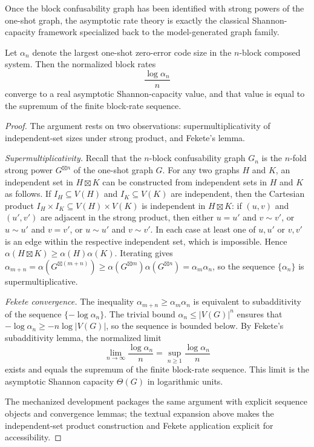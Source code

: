 Once the block confusability graph has been identified with strong powers of the one-shot graph, the asymptotic rate theory is exactly the classical Shannon-capacity framework specialized back to the model-generated graph family.

\begin{theorem}\label{thm:asymptotic-capacity}
Let $\alpha_n$ denote the largest one-shot zero-error code size in the $n$-block composed system. Then the normalized block rates
\[
\frac{\log \alpha_n}{n}
\]
converge to a real asymptotic Shannon-capacity value, and that value is equal to the supremum of the finite block-rate sequence.
\end{theorem}

\begin{proof}
The argument rests on two observations: supermultiplicativity of independent-set sizes under strong product, and Fekete's lemma.

\emph{Supermultiplicativity.} Recall that the $n$-block confusability graph $G_n$ is the $n$-fold strong power $G^{\boxtimes n}$ of the one-shot graph $G$. For any two graphs $H$ and $K$, an independent set in $H\boxtimes K$ can be constructed from independent sets in $H$ and $K$ as follows. If $I_H\subseteq V(H)$ and $I_K\subseteq V(K)$ are independent, then the Cartesian product $I_H\times I_K\subseteq V(H)\times V(K)$ is independent in $H\boxtimes K$: if $(u,v)$ and $(u',v')$ are adjacent in the strong product, then either $u=u'$ and $v\sim v'$, or $u\sim u'$ and $v=v'$, or $u\sim u'$ and $v\sim v'$. In each case at least one of $u,u'$ or $v,v'$ is an edge within the respective independent set, which is impossible. Hence $\alpha(H\boxtimes K)\ge\alpha(H)\alpha(K)$. Iterating gives $\alpha_{m+n}=\alpha(G^{\boxtimes(m+n)})\ge\alpha(G^{\boxtimes m})\alpha(G^{\boxtimes n})=\alpha_m\alpha_n$, so the sequence $\{\alpha_n\}$ is supermultiplicative.

\emph{Fekete convergence.} The inequality $\alpha_{m+n}\ge\alpha_m\alpha_n$ is equivalent to subadditivity of the sequence $\{-\log\alpha_n\}$. The trivial bound $\alpha_n\le|V(G)|^n$ ensures that $-\log\alpha_n\ge -n\log|V(G)|$, so the sequence is bounded below. By Fekete's subadditivity lemma, the normalized limit
\[
\lim_{n\to\infty}\frac{\log\alpha_n}{n}=\sup_{n\ge1}\frac{\log\alpha_n}{n}
\]
exists and equals the supremum of the finite block-rate sequence. This limit is the asymptotic Shannon capacity $\Theta(G)$ in logarithmic units.

The mechanized development packages the same argument with explicit sequence objects and convergence lemmas; the textual expansion above makes the independent-set product construction and Fekete application explicit for accessibility.
\end{proof}


